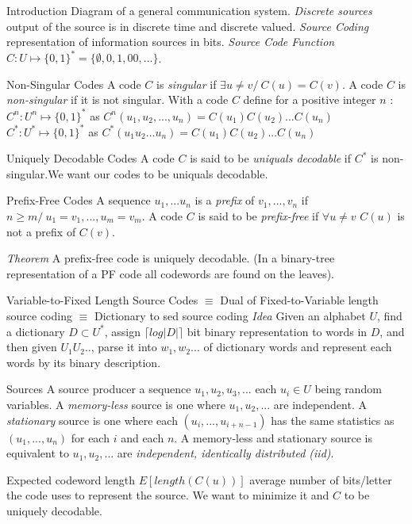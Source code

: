 \documentclass[12pt,a4paper,oneside]{article} %
\newcommand{\concept}[1]{\textcolor{rtLightBlue900}{#1}}
\newcommand{\subconcept}[1]{\textcolor{rtLightBlue900}{\textit{#1}}}
\begin{document}
\concept{Introduction}
Diagram of a general communication system.
\subconcept{Discrete sources} output of the source is in discrete time and discrete valued.
\subconcept{Source Coding} representation of information sources in bits.
\subconcept{Source Code Function} $C:U\mapsto\{0,1\}^*=\{\emptyset,0,1,00,...\}$.

\concept{Non-Singular Codes} 
A code $C$ is \subconcept{singular} if $\exists u \neq v /\ C(u)=C(v)$. A code $C$ is \subconcept{non-singular} if it is not singular.
With a code $C$ define for a positive integer $n$ :
$C^n:U^n\mapsto\{0,1\}^*$ as $C^n(u_1,u_2,...,u_n)=C(u_1)C(u_2)...C(u_n)$
$C^*:U^*\mapsto\{0,1\}^*$ as $C^*(u_1u_2...u_n)=C(u_1)C(u_2)...C(u_n)$

\concept{Uniquely Decodable Codes}
A code $C$ is said to be \subconcept{uniquals decodable} if $C^*$ is non-singular.We want our codes to be uniquals decodable.

\concept{Prefix-Free Codes} 
A sequence $u_1,... u_n$ is a \subconcept{prefix} of $v_1,...,v_n$ if $n \geqslant m /\ u_1=v_1,...,u_m=v_m$.
A code $C$ is said to be \subconcept{prefix-free} if $\forall u \neq v$ $C(u)$ is not a prefix of $C(v)$.

\subconcept{Theorem} A prefix-free code is uniquely decodable.
(In a binary-tree representation of a PF code all codewords are found on the leaves).

\concept{Variable-to-Fixed Length Source Codes}
$\equiv$ Dual of Fixed-to-Variable length source coding
$\equiv$ Dictionary to sed source coding
\subconcept{Idea} Given an alphabet $U$, find a dictionary $D \subset U^*$, assign $\lceil log|D| \rceil$ bit binary representation to words in $D$, and then given $U_1U_2..$, parse it into $w_1,w_2...$ of dictionary words and represent each words by its binary description.

\concept{Sources} A source producer a sequence $u_1,u_2,u_3,...$ each $u_i \in U$ being random variables.
A \subconcept{memory-less} source is one where $u_1,u_2,...$ are independent.
A \subconcept{stationary} source is one where each $(u_i,...,u_{i+n-1})$ has the same statistics as $(u_1,...,u_n)$ for each $i$ and each $n$.
A memory-less and stationary source is equivalent to $u_1,u_2,...$ are \subconcept{independent, identically distributed (iid)}.

\concept{Expected codeword length}
$E\left[ length(C(u)) \right]$ average number of bits/letter the code uses to represent the source. We want to minimize it and $C$ to be uniquely decodable.
\end{document}
